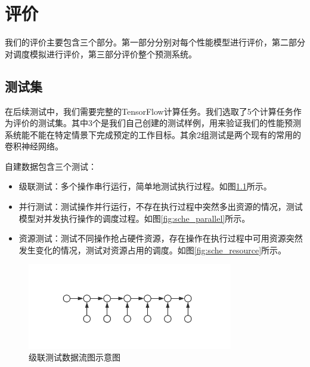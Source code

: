 \chapter{评价}
\label{cha:eval}
    我们的评价主要包含三个部分。第一部分分别对每个性能模型进行评价，第二部分对调度模拟进行评价，第三部分评价整个预测系统。

\section{测试集}
    在后续测试中，我们需要完整的TensorFlow计算任务。我们选取了5个计算任务作为评价的测试集。其中3个是我们自己创建的测试样例，用来验证我们的性能预测系统能不能在特定情景下完成预定的工作目标。其余2组测试是两个现有的常用的卷积神经网络。

    自建数据包含三个测试：
    
    \begin{itemize}
        \item 级联测试：多个操作串行运行，简单地测试执行过程。如图\ref{fig:sche_cascade}所示。
        \item 并行测试：测试操作并行运行，不存在执行过程中突然多出资源的情况，测试模型对并发执行操作的调度过程。如图\ref{fig:sche_parallel}所示。
        \item 资源测试：测试不同操作抢占硬件资源，存在操作在执行过程中可用资源突然发生变化的情况，测试对资源占用的调度。如图\ref{fig:sche_resource}所示。
    \end{itemize}

    \begin{figure}[!htbp]
        \centering
        \includegraphics[width=0.8\textwidth]{figures/sche_cascade.jpg}
        \caption{级联测试数据流图示意图}
        \label{fig:sche_cascade}
    \end{figure}

